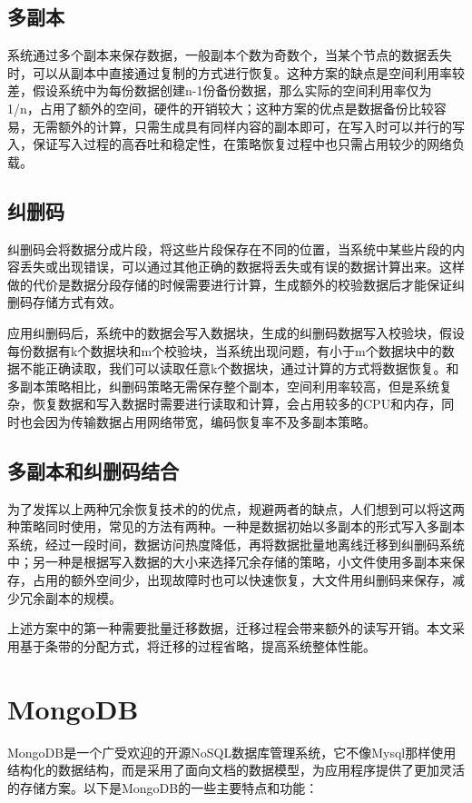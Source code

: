 \subsection{多副本}%
系统通过多个副本来保存数据，一般副本个数为奇数个，当某个节点的数据丢失时，可以从副本中直接通过复制的方式进行恢复。这种方案的缺点是空间利用率较差，假设系统中为每份数据创建n-1份备份数据，那么实际的空间利用率仅为 1/n，占用了额外的空间，硬件的开销较大；这种方案的优点是数据备份比较容易，无需额外的计算，只需生成具有同样内容的副本即可，在写入时可以并行的写入，保证写入过程的高吞吐和稳定性，在策略恢复过程中也只需占用较少的网络负载。
\subsection{纠删码}%
纠删码会将数据分成片段，将这些片段保存在不同的位置，当系统中某些片段的内容丢失或出现错误，可以通过其他正确的数据将丢失或有误的数据计算出来。这样做的代价是数据分段存储的时候需要进行计算，生成额外的校验数据后才能保证纠删码存储方式有效。

应用纠删码后，系统中的数据会写入数据块，生成的纠删码数据写入校验块，假设每份数据有k个数据块和m个校验块，当系统出现问题，有小于m个数据块中的数据不能正确读取，我们可以读取任意k个数据块，通过计算的方式将数据恢复。和多副本策略相比，纠删码策略无需保存整个副本，空间利用率较高，但是系统复杂，恢复数据和写入数据时需要进行读取和计算，会占用较多的CPU和内存，同时也会因为传输数据占用网络带宽，编码恢复率不及多副本策略。
\subsection{多副本和纠删码结合}%
为了发挥以上两种冗余恢复技术的的优点，规避两者的缺点，人们想到可以将这两种策略同时使用，常见的方法有两种。一种是数据初始以多副本的形式写入多副本系统，经过一段时间，数据访问热度降低，再将数据批量地离线迁移到纠删码系统中；另一种是根据写入数据的大小来选择冗余存储的策略，小文件使用多副本来保存，占用的额外空间少，出现故障时也可以快速恢复，大文件用纠删码来保存，减少冗余副本的规模。

上述方案中的第一种需要批量迁移数据，迁移过程会带来额外的读写开销。本文采用基于条带的分配方式，将迁移的过程省略，提高系统整体性能。

\section{MongoDB}%
MongoDB是一个广受欢迎的开源NoSQL数据库管理系统，它不像Mysql那样使用结构化的数据结构，而是采用了面向文档的数据模型，为应用程序提供了更加灵活的存储方案。以下是MongoDB的一些主要特点和功能：

